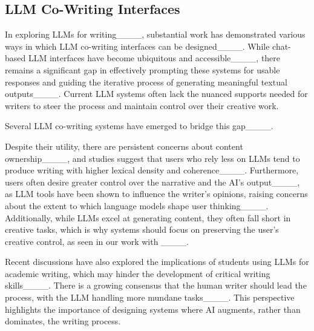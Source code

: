 \subsection{LLM Co-Writing Interfaces}
In exploring LLMs for writing____, substantial work has demonstrated various ways in which LLM co-writing interfaces can be designed____. While chat-based LLM interfaces have become ubiquitous and accessible____, there remains a significant gap in effectively prompting these systems for usable responses and guiding the iterative process of generating meaningful textual outputs____. Current LLM systems often lack the nuanced supports needed for writers to steer the process and maintain control over their creative work.


Several LLM co-writing systems have emerged to bridge this gap____. 

Despite their utility, there are persistent concerns about content ownership____, and studies suggest that users who rely less on LLMs tend to produce writing with higher lexical density and coherence____. Furthermore, users often desire greater control over the narrative and the AI's output____, as LLM tools have been shown to influence the writer’s opinions, raising concerns about the extent to which language models shape user thinking____. Additionally, while LLMs excel at generating content, they often fall short in creative tasks, which is why systems should focus on preserving the user's creative control, as seen in our work with \system____.

Recent discussions have also explored the implications of students using LLMs for academic writing, which may hinder the development of critical writing skills____. There is a growing consensus that the human writer should lead the process, with the LLM handling more mundane tasks____. This perspective highlights the importance of designing systems where AI augments, rather than dominates, the writing process.

